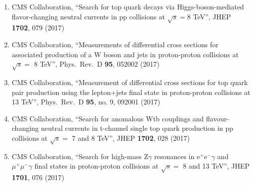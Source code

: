 \begin{enumerate}
\item CMS Collaboration, ``Search for top quark decays via Higgs-boson-mediated flavor-changing neutral currents in pp collisions at $ \sqrt{s}=8 $ TeV'', JHEP {\bf 1702}, 079 (2017)

\item CMS Collaboration, ``Measurements of differential cross sections for associated production of a W boson and jets in proton-proton collisions at $\sqrt{s} =$ 8 TeV'', Phys.\ Rev.\ D {\bf 95}, 052002 (2017)

\item CMS Collaboration, ``Measurement of differential cross sections for top quark pair production using the lepton+jets final state in proton-proton collisions at 13 TeV'', Phys.\ Rev.\ D {\bf 95}, no. 9, 092001 (2017)

\item CMS Collaboration, ``Search for anomalous Wtb couplings and flavour-changing neutral currents in t-channel single top quark production in pp collisions at $\sqrt{s} =$ 7 and 8 TeV'', JHEP {\bf 1702}, 028 (2017)

\item CMS Collaboration, ``Search for high-mass Z$\gamma$ resonances in $\mathrm{ e }^{+}\mathrm{ e }^{-}\gamma $ and $ \mu^{+}\mu^{-}\gamma$ final states in proton-proton collisions at $\sqrt{s} =$ 8 and 13 TeV'', JHEP {\bf 1701}, 076 (2017)


\end{enumerate}
